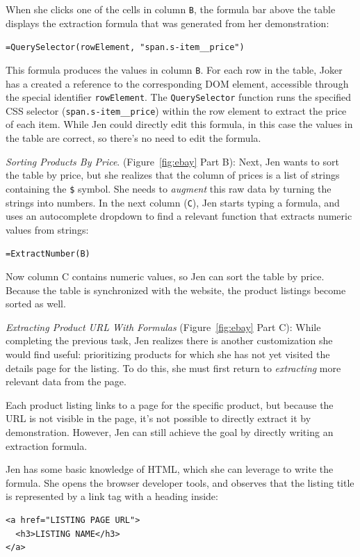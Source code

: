\documentclass[sigconf,10pt]{acmart}
\begin{document}
When she clicks one of the cells in column \texttt{B}, the formula bar
above the table displays the extraction formula that was generated from
her demonstration:

\texttt{=QuerySelector(rowElement,\ "span.s-item\_\_price")}

This formula produces the values in column \texttt{B}. For each row in
the table, Joker has a created a reference to the corresponding DOM
element, accessible through the special identifier \texttt{rowElement}.
The \texttt{QuerySelector} function runs the specified CSS selector
(\texttt{span.s-item\_\_price}) within the row element to extract the
price of each item. While Jen could directly edit this formula, in this
case the values in the table are correct, so there's no need to edit the
formula.

\emph{Sorting Products By Price}. (Figure~\ref{fig:ebay} Part B): Next,
Jen wants to sort the table by price, but she realizes that the column
of prices is a list of strings containing the \texttt{\$} symbol. She
needs to \emph{augment} this raw data by turning the strings into
numbers. In the next column (\texttt{C}), Jen starts typing a formula,
and uses an autocomplete dropdown to find a relevant function that
extracts numeric values from strings:

\texttt{=ExtractNumber(B)}

Now column C contains numeric values, so Jen can sort the table by
price. Because the table is synchronized with the website, the product
listings become sorted as well.

\emph{Extracting Product URL With Formulas} (Figure~\ref{fig:ebay} Part
C): While completing the previous task, Jen realizes there is another
customization she would find useful: prioritizing products for which she
has not yet visited the details page for the listing. To do this, she
must first return to \emph{extracting} more relevant data from the page.

Each product listing links to a page for the specific product, but
because the URL is not visible in the page, it's not possible to
directly extract it by demonstration. However, Jen can still achieve the
goal by directly writing an extraction formula.

Jen has some basic knowledge of HTML, which she can leverage to write
the formula. She opens the browser developer tools, and observes that
the listing title is represented by a link tag with a heading inside:

\begin{verbatim}
<a href="LISTING PAGE URL">
  <h3>LISTING NAME</h3>
</a>
\end{verbatim}
\end{document}
